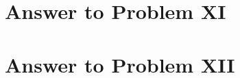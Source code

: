 \documentclass[11pt,a4paper]{article}
\begin{document}
\section{Answer to Problem XI}\label{sec:P11}



\clearpage

\section{Answer to Problem XII}\label{sec:P12}



\clearpage


\printbibliography

\end{document}
